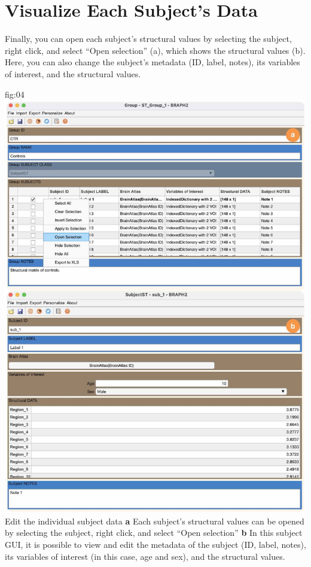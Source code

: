 \documentclass[justified]{tufte-handout}
\begin{document}

\section{Visualize Each Subject's Data}

Finally, you can open each subject's structural values by selecting the subject, right click, and select ``Open selection'' (a), which shows the structural values (b). Here, you can also change the subject's metadata (ID, label, notes), its variables of interest, and the structural values.

	{fig:04}
	{\includegraphics{fig04.jpg}
	}
	{Edit the individual subject data}
	{
	{\bf a}  Each subject's structural values can be opened by selecting the subject, right click, and select ``Open selection''
	{\bf b} In this subject GUI, it is possible to view and edit the metadata of the subject (ID, label, notes), its variables of interest (in this case, age and sex), and the structural values. 
	}
\end{document}
